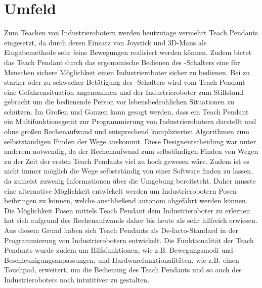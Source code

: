 \section{Umfeld}
Zum Teachen von Industrierobotern werden heutzutage vermehrt Teach Pendants eingesetzt, da durch deren Einsatz von Joystick und 3D-Maus als Eingabemethode sehr feine Bewegungen realisiert werden können. Zudem bietet das Teach Pendant durch das ergonomische Bedienen des -Schalters eine für Menschen sichere Möglichkeit einen Industrieroboter sicher zu bedienen. Bei zu starker oder zu schwacher Betätigung des -Schalters wird vom Teach Pendant eine Gefahrensituation angenommen und der Industrieroboter zum Stillstand gebracht um die bedienende Person vor lebensbedrohlichen Situationen zu schützen. Im Großen und Ganzen kann gesagt werden, dass ein Teach Pendant ein Multifunktionsgerät zur Programmierung von Industrierobotern darstellt und ohne großen Rechenaufwand und entsprechend komplizierten Algorithmen zum selbstständigen Finden der Wege auskommt. Diese Designentscheidung war unter anderem notwendig, da der Rechenaufwand zum selbständigen Finden von Wegen zu der Zeit der ersten Teach Pendants viel zu hoch gewesen wäre. Zudem ist es nicht immer möglich die Wege selbstständig von einer Software finden zu lassen, da zumeist zuwenig Informationen über die Umgebung bereitsteht. Daher musste eine alternative Möglichkeit entwickelt werden um Industrierobotern Posen beibringen zu können, welche anschließend autonom abgefahrt werden können. Die Möglichkeit Posen mittels Teach Pendant dem Industrieroboter zu erlernen hat sich aufgrund des Rechenaufwands daher bis heute als sehr hilfreich erwiesen. Aus diesem Grund haben sich Teach Pendants als De-facto-Standard in der Programmierung von Industrierobotern entwickelt. Die Funktionalität der Teach Pendants wurde zudem um Hilfsfunktionen, wie z.B. Bewegungsmodi und Beschleunigungsanpassungen, und Hardwarefunktionalitäten, wie z.B. einen Touchpad, erweitert, um die Bedienung des Teach Pendants und so auch des Industrieroboters noch intutitiver zu gestalten.

